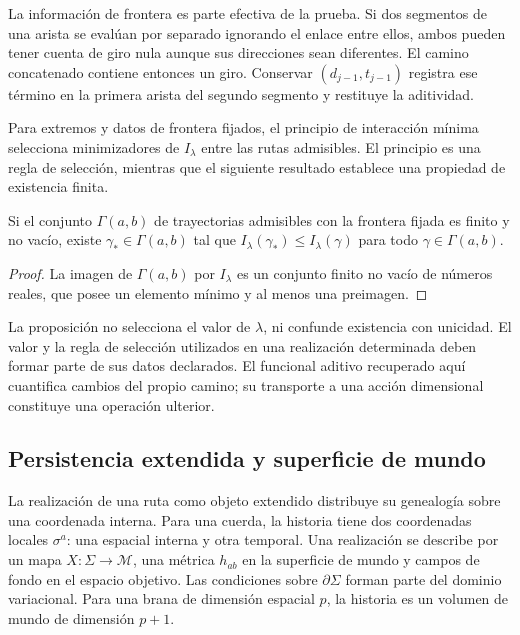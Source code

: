 La información de frontera es parte efectiva de la prueba.
Si dos segmentos de una arista se evalúan por separado
ignorando el enlace entre ellos, ambos pueden tener cuenta
de giro nula aunque sus direcciones sean diferentes. El
camino concatenado contiene entonces un giro. Conservar
\((d_{j-1},t_{j-1})\) registra ese término en la primera
arista del segundo segmento y restituye la aditividad.

Para extremos y datos de frontera fijados, el principio de
interacción mínima selecciona minimizadores de
\(I_\lambda\) entre las rutas admisibles. El principio
es una regla de selección, mientras que el siguiente
resultado establece una propiedad de existencia finita.

\begin{proposition}
Si el conjunto \(\Gamma(a,b)\) de trayectorias admisibles
con la frontera fijada es finito y no vacío, existe
\(\gamma_*\in\Gamma(a,b)\) tal que
\(I_\lambda(\gamma_*)\leq I_\lambda(\gamma)\)
para todo \(\gamma\in\Gamma(a,b)\).
\end{proposition}
\begin{proof}
La imagen de \(\Gamma(a,b)\) por \(I_\lambda\) es
un conjunto finito no vacío de números reales, que posee
un elemento mínimo y al menos una preimagen.
\end{proof}

La proposición no selecciona el valor de \(\lambda\),
ni confunde existencia con unicidad. El valor y la regla
de selección utilizados en una realización determinada
deben formar parte de sus datos declarados. El funcional
aditivo recuperado aquí cuantifica cambios del propio
camino; su transporte a una acción dimensional constituye
una operación ulterior.

\subsection{Persistencia extendida y superficie de mundo}

La realización de una ruta como objeto extendido distribuye
su genealogía sobre una coordenada interna. Para una cuerda,
la historia tiene dos coordenadas locales \(\sigma^a\):
una espacial interna y otra temporal. Una realización se
describe por un mapa \(X:\Sigma\to\mathcal M\), una
métrica \(h_{ab}\) en la superficie de mundo y campos
de fondo en el espacio objetivo. Las condiciones sobre
\(\partial\Sigma\) forman parte del dominio variacional.
Para una brana de dimensión espacial \(p\), la historia
es un volumen de mundo de dimensión \(p+1\).

